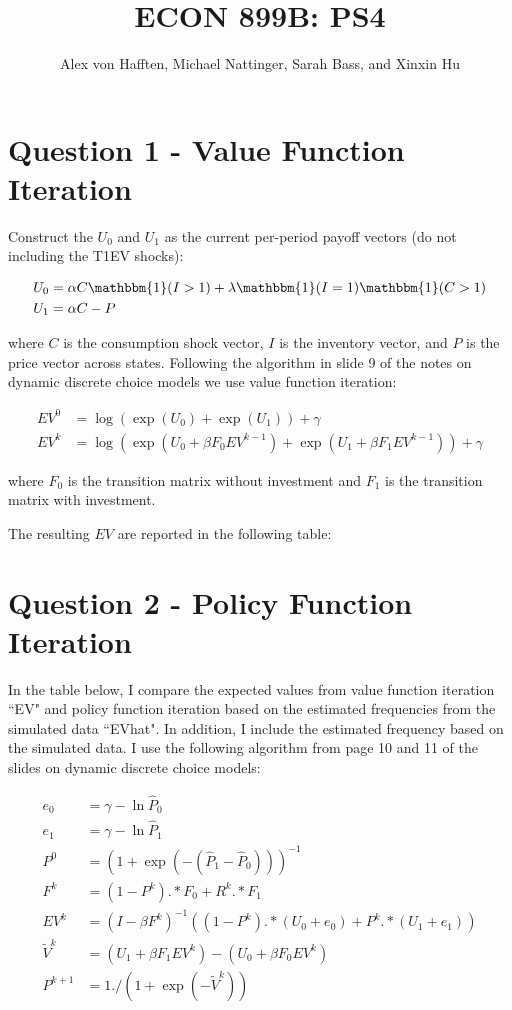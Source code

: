 \documentclass{article}
\title{ECON 899B: PS4}
\author{Alex von Hafften, Michael Nattinger, Sarah Bass, and Xinxin Hu}
\newcommand{\onebf}{\mathbbm{1}}
\begin{document}
\maketitle

\section*{Question 1 - Value Function Iteration}

Construct the $U_0$ and $U_1$ as the current per-period payoff vectors (do not including the T1EV shocks):

\begin{align*}
U_0 &= \alpha C \onebf(I > 1) + \lambda\onebf(I = 1)\onebf(C > 1) \\
U_1 &= \alpha C - P
\end{align*}

where $C$ is the consumption shock vector, $I$ is the inventory vector, and $P$ is the price vector across states. Following the algorithm in slide 9 of the notes on dynamic discrete choice models we use value function iteration:

\begin{align*}
EV^0 &= \log (\exp(U_0) + \exp(U_1)) + \gamma \\
EV^k &= \log (\exp(U_0 + \beta F_0 EV^{k-1}) + \exp(U_1 + \beta F_1 EV^{k-1})) + \gamma
\end{align*}

where $F_0$ is the transition matrix without investment and $F_1$ is the transition matrix with investment. 

\bigskip

The resulting $EV$ are reported in the following table:


\pagebreak

\section*{Question 2 - Policy Function Iteration}

In the table below, I compare the expected values from value function iteration ``EV" and policy function iteration based on the estimated frequencies from the simulated data ``EVhat". In addition, I include the estimated frequency based on the simulated data. I use the following algorithm from page 10 and 11 of the slides on dynamic discrete choice models:

\begin{align*}
e_0 &= \gamma - \ln \hat{P}_0\\
e_1 &= \gamma - \ln \hat{P}_1\\
P^0 &= (1 + \exp(-(\hat{P}_1 -\hat{P}_0)))^{-1}\\
F^k &= (1-P^k) .*F_0 + R^k .* F_1 \\
EV^k &= (I - \beta F^k)^{-1} ((1-P^k) .* (U_0 + e_0) + P^k .* (U_1 + e_1))\\
\tilde{V}^k &= (U_1 + \beta F_1 EV^k) - (U_0 + \beta F_0 EV^k)\\
P^{k+1} &= 1./(1 + \exp(-\tilde{V}^k))
\end{align*}
\end{document}
